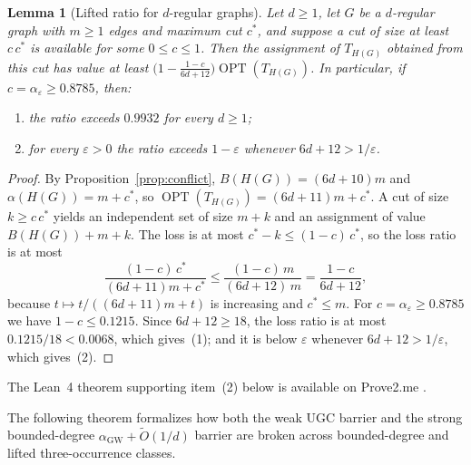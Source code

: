 \documentclass[11pt]{amsart}
\newtheorem{lemma}[theorem]{Lemma}
\begin{document}
\begin{lemma}[Lifted ratio for $d$-regular graphs]\label{lem:strong-lift}
Let $d \ge 1$, let $G$ be a $d$-regular graph with $m \ge 1$ edges and maximum cut $c^\ast$, and suppose a cut of size at least $c\,c^\ast$ is available for some $0 \le c \le 1$. Then the assignment of $T_{H(G)}$ obtained from this cut has value at least $\bigl(1 - \frac{1-c}{6d+12}\bigr)\operatorname{OPT}(T_{H(G)})$. In particular, if $c = \alpha_\varepsilon \ge 0.8785$, then:
\begin{enumerate}
\item the ratio exceeds $0.9932$ for every $d \ge 1$;
\item for every $\varepsilon > 0$ the ratio exceeds $1 - \varepsilon$ whenever $6d+12 > 1/\varepsilon$.
\end{enumerate}
\end{lemma}

\begin{proof}
By Proposition~\ref{prop:conflict}, $B(H(G)) = (6d+10)m$ and $\alpha(H(G)) = m + c^\ast$, so $\operatorname{OPT}(T_{H(G)}) = (6d+11)m + c^\ast$. A cut of size $k \ge c\,c^\ast$ yields an independent set of size $m+k$ and an assignment of value $B(H(G)) + m + k$. The loss is at most $c^\ast - k \le (1-c)\,c^\ast$, so the loss ratio is at most
\[
\frac{(1-c)\,c^\ast}{(6d+11)m + c^\ast} \le \frac{(1-c)\,m}{(6d+12)\,m} = \frac{1-c}{6d+12},
\]
because $t \mapsto t/((6d+11)m + t)$ is increasing and $c^\ast \le m$. For $c = \alpha_\varepsilon \ge 0.8785$ we have $1-c \le 0.1215$. Since $6d+12 \ge 18$, the loss ratio is at most $0.1215/18 < 0.0068$, which gives~(1); and it is below $\varepsilon$ whenever $6d+12 > 1/\varepsilon$, which gives~(2).
\end{proof}

The Lean~4 theorem supporting item~(2) below is available on Prove2.me \cite{VegaProve2MeStrongUgcBroken2026}.

The following theorem formalizes how both the weak UGC barrier and the strong bounded-degree $\alpha_{\mathrm{GW}} + \widetilde{O}(1/d)$ barrier are broken across bounded-degree and lifted three-occurrence classes.
\end{document}
